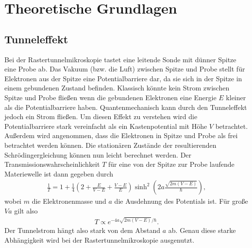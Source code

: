 \section{Theoretische Grundlagen}

\subsection{Tunneleffekt}
Bei der Rastertunnelmikroskopie tastet eine leitende Sonde mit dünner Spitze eine Probe ab. Das Vakuum (bzw. die Luft) zwischen Spitze und Probe stellt für Elektronen aus der Spitze eine Potentialbarriere dar, da sie sich in der Spitze in einem gebundenen Zustand befinden. Klassisch könnte kein Strom zwischen Spitze und Probe fließen wenn die gebundenen Elektronen eine Energie $E$ kleiner als die Potentialbarriere haben. Quantenmechanisch kann durch den Tunneleffekt jedoch ein Strom fließen. Um diesen Effekt zu verstehen wird die Potentialbarriere stark vereinfacht als ein Kastenpotential mit Höhe $V$ betrachtet. Außerdem wird angenommen, dass die Elektronen in Spitze und Probe als frei betrachtet werden können. Die stationären Zustände der resultierenden Schrödingergleichung können nun leicht berechnet werden. Der Transmissionswahrscheinlichkeit $T$ für eine von der Spitze zur Probe laufende Materiewelle ist dann gegeben durch
\begin{align*}
  \frac{1}{T}=1+\frac{1}{4}\left( 2+\frac{E}{V-E} + \frac{V-E}{E}\right) \sinh^2\left( 2a \frac{\sqrt{2m(V-E)}}{\hbar} \right), 
\end{align*}
wobei $m$ die Elektronenmasse und $a$ die Ausdehnung des Potentials ist.
Für große $Va$ gilt also
\begin{align}
  T \propto e^{-4a\sqrt{2m(V-E)}/\hbar}.
  \label{eq:T}
\end{align}  
Der Tunnelstrom hängt also stark von dem Abstand $a$ ab. Genau diese starke Abhängigkeit wird bei der Rastertunnelmikroskopie ausgenutzt. 

